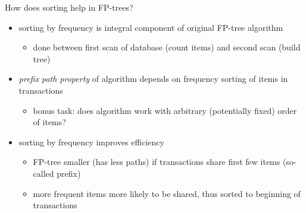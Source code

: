 \documentclass[12pt]{article}
\begin{document}
\begin{question}
	How does sorting help in FP-trees?
\end{question}

\begin{itemize}[left=0pt, nosep]
	\item sorting by frequency is integral component of original FP-tree algorithm
	\begin{itemize}[left=0pt, nosep]
		\item done between first scan of database (count items) and second scan (build tree)
	\end{itemize}
	\item \emph{prefix path property} of algorithm depends on frequency sorting of items in transactions
	\begin{itemize}[left=0pt, nosep]
		\item bonus task: does algorithm work with arbitrary (potentially fixed) order of items?
	\end{itemize}
	\item sorting by frequency improves efficiency
	\begin{itemize}[left=0pt, nosep]
		\item FP-tree smaller (has less paths) if transactions share first few items (so-called prefix)
		\item more frequent items more likely to be shared, thus sorted to beginning of transactions
	\end{itemize}
\end{itemize}
\end{document}
